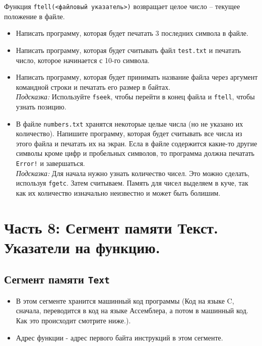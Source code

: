 \documentclass{article}
\begin{document}
Функция \texttt{ftell(<файловый указатель>)} возвращает целое число -- текущее положение в файле.

\begin{itemize}
\item Написать программу, которая будет печатать 3 последних символа в файле.\\
\item Написать программу, которая будет считывать файл \texttt{test.txt} и печатать число, которое начинается с 10-го символа.
\item Написать программу, которая будет принимать название файла через аргумент командной строки и печатать его размер в байтах.\\
\textit{Подсказка:} Используйте \texttt{fseek}, чтобы перейти в конец файла и \texttt{ftell}, чтобы узнать позицию.

\item В файле \texttt{numbers.txt} хранятся некоторые целые числа (но не указано их количество). Напишите программу, которая будет считывать все числа из этого файла и печатать их на экран. Есла в файле содержится какие-то другие символы кроме цифр и пробельных символов, то программа должна печатать \texttt{Error!} и завершаться.\\
\textit{Подсказка:} Для начала нужно узнать количество чисел. Это можно сделать, используя \texttt{fgetc}. Затем считываем. Память для чисел выделяем в куче, так как их количество изначально неизвестно и может быть болишим.
\end{itemize}





\newpage
\section*{Часть 8: Сегмент памяти Текст. Указатели на функцию.}

\subsection*{Сегмент памяти \texttt{Text}}
\begin{itemize}
\item В этом сегменте хранится машинный код программы (Код на языке C, сначала, переводится в код на языке Ассемблера, а потом в машинный код. Как это происходит смотрите ниже.).
\item Адрес функции - адрес первого байта инструкций в этом сегменте.
\end{itemize}
\end{document}

